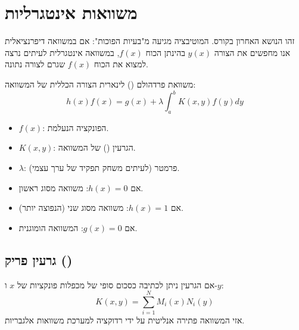 \section{משוואות אינטגרליות}

זהו הנושא האחרון בקורס. המוטיבציה מגיעה מ"בעיות הפוכות": אם במשוואה דיפרנציאלית אנו מחפשים את הצורה $y(x)$ בהינתן הכוח $f(x)$, במשוואה אינטגרלית לעיתים נרצה למצוא את הכוח $f(x)$ שגרם לצורה נתונה.

\begin{definitionbox}{משוואת פרדהולם () לינארית}
הצורה הכללית של המשוואה:
$$ h(x)f(x) = g(x) + \lambda \int_{a}^{b} K(x,y)f(y) dy $$
\begin{itemize}
    \item $f(x)$: הפונקציה הנעלמת.
    \item $K(x,y)$: הגרעין () של המשוואה.
    \item $\lambda$: פרמטר (לעיתים משחק תפקיד של ערך עצמי).
    \item אם $h(x)=0$: משוואה מסוג ראשון.
    \item אם $h(x)=1$: משוואה מסוג שני (הנפוצה יותר).
    \item אם $g(x)=0$: המשוואה הומוגנית.
\end{itemize}
\end{definitionbox}

\subsection{גרעין פריק ()}
אם הגרעין ניתן לכתיבה כסכום סופי של מכפלות פונקציות של $x$ ו-$y$:
$$ K(x,y) = \sum_{i=1}^{N} M_i(x) N_i(y) $$
אזי המשוואה פתירה אנליטית על ידי רדוקציה למערכת משוואות אלגבריות.

